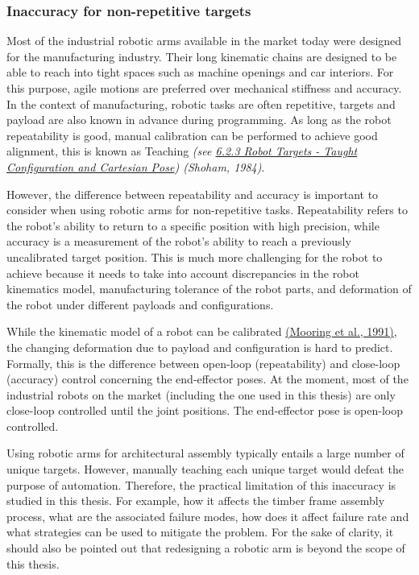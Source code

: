 \documentclass[11pt]{book}
\begin{document}
\subsubsection{Inaccuracy for non-repetitive targets}

Most of the industrial robotic arms available in the market today were designed for the manufacturing industry. Their long kinematic chains are designed to be able to reach into tight spaces such as machine openings and car interiors. For this purpose, agile motions are preferred over mechanical stiffness and accuracy. In the context of manufacturing, robotic tasks are often repetitive, targets and payload are also known in advance during programming. As long as the robot repeatability is good, manual calibration can be performed to achieve good alignment, this is known as Teaching \textit{(see \uline{6.2.3 Robot Targets - Taught Configuration and Cartesian Pose}) \href{https://www.zotero.org/google-docs/?A4enMq}{}(Shoham, 1984)}.

However, the difference between repeatability and accuracy is important to consider when using robotic arms for non-repetitive tasks. Repeatability refers to the robot's ability to return to a specific position with high precision, while accuracy is a measurement of the robot's ability to reach a previously uncalibrated target position. This is much more challenging for the robot to achieve because it needs to take into account discrepancies in the robot kinematics model, manufacturing tolerance of the robot parts, and deformation of the robot under different payloads and configurations. 

While the kinematic model of a robot can be calibrated \href{https://www.zotero.org/google-docs/?nvFaK9}{(Mooring et al., 1991)}, the changing deformation due to payload and configuration is hard to predict. Formally, this is the difference between open-loop (repeatability) and close-loop (accuracy) control concerning the end-effector poses. At the moment, most of the industrial robots on the market (including the one used in this thesis) are only close-loop controlled until the joint positions. The end-effector pose is open-loop controlled.  

Using robotic arms for architectural assembly typically entails a large number of unique targets. However, manually teaching each unique target would defeat the purpose of automation. Therefore, the practical limitation of this inaccuracy is studied in this thesis. For example, how it affects the timber frame assembly process, what are the associated failure modes, how does it affect failure rate and what strategies can be used to mitigate the problem. For the sake of clarity, it should also be pointed out that redesigning a robotic arm is beyond the scope of this thesis.
\end{document}
